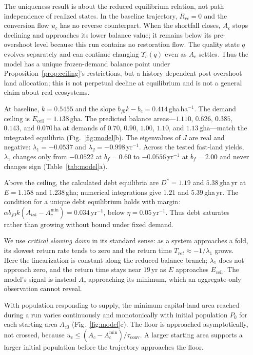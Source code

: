 \documentclass[preprint,12pt,authoryear]{elsarticle}
\newcommand{\Ups}{\Upsilon_c}
\newcommand{\Eceil}{E_{\mathrm{ceil}}}
\newcommand{\Acmin}{A_c^{\min}}
\newcommand{\tconv}{\tau_{\mathrm{conv}}}
\begin{document}
The uniqueness result is about the reduced equilibrium relation, not path independence of realized states. In the baseline trajectory, $R_{rc}=0$ and the conversion flow $u_c$ has no reverse counterpart. When the shortfall closes, $A_c$ stops declining and approaches its lower balance value; it remains below its pre-overshoot level because this run contains no restoration flow. The quality state $q$ evolves separately and can continue changing $\Ups(q)$ even as $A_c$ settles. Thus the model has a unique frozen-demand balance point under Proposition~\ref{prop:ceiling}'s restrictions, but a history-dependent post-overshoot land allocation; this is not perpetual decline at equilibrium and is not a general claim about real ecosystems.

At baseline, $k=0.5455$ and the slope $b_{f0}k-b_c=0.414$\,gha\,ha$^{-1}$. The demand ceiling is $\Eceil=1.138$\,gha. The predicted balance areas—$1.110$, $0.626$, $0.385$, $0.143$, and $0.070$\,ha at demands of $0.70$, $0.90$, $1.00$, $1.10$, and $1.13$\,gha—match the integrated equilibria (Fig.~\ref{fig:model}b). The eigenvalues of $J$ are real and negative: $\lambda_1=-0.0537$ and $\lambda_2=-0.998$\,yr$^{-1}$. Across the tested fast-land yields, $\lambda_1$ changes only from $-0.0522$ at $b_f=0.60$ to $-0.0556$\,yr$^{-1}$ at $b_f=2.00$ and never changes sign (Table~\ref{tab:model}a).

Above the ceiling, the calculated debt equilibria are $D^*=1.19$ and $5.38$\,gha\,yr at $E=1.158$ and $1.238$\,gha; numerical integrations give $1.21$ and $5.39$\,gha\,yr. The condition for a unique debt equilibrium holds with margin: $\alpha b_{f0}k(A_{tot}-\Acmin)=0.034$\,yr$^{-1}$, below $\eta=0.05$\,yr$^{-1}$. Thus debt saturates rather than growing without bound under fixed demand.

We use \emph{critical slowing down} in its standard sense: as a system approaches a fold, its slowest return rate tends to zero and the return time $T_{ret}\approx-1/\lambda_1$ grows. Here the linearization is constant along the reduced balance branch; $\lambda_1$ does not approach zero, and the return time stays near $19$\,yr as $E$ approaches $\Eceil$. The model's signal is instead $A_c$ approaching its minimum, which an aggregate-only observation cannot reveal.

With population responding to supply, the minimum capital-land area reached during a run varies continuously and monotonically with initial population $P_0$ for each starting area $A_{c0}$ (Fig.~\ref{fig:model}c). The floor is approached asymptotically, not crossed, because $u_c\le(A_c-\Acmin)/\tconv$. A larger starting area supports a larger initial population before the trajectory approaches the floor.
\end{document}

